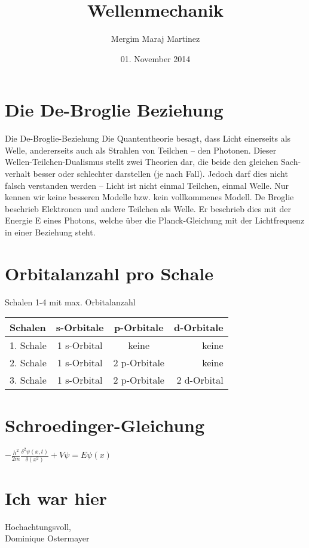 \documentclass{article}
\author{Mergim Maraj Martinez}
\title{Wellenmechanik}
\date{01. November 2014}
\begin{document}
\maketitle

\section{Die De-Broglie Beziehung}
Die De-Broglie-Beziehung
Die Quantentheorie besagt, dass Licht einerseits als Welle, andererseits auch als Strahlen von Teilchen – den Photonen. Dieser Wellen-Teilchen-Dualismus stellt zwei Theorien dar, die beide den gleichen Sach-verhalt besser oder schlechter darstellen (je nach Fall). Jedoch darf dies nicht falsch verstanden werden – Licht ist nicht einmal Teilchen, einmal Welle. Nur kennen wir keine besseren Modelle bzw. kein vollkommenes Modell. De Broglie beschrieb Elektronen und andere Teilchen als Welle. Er beschrieb dies mit der Energie E eines Photons, welche über die Planck-Gleichung mit der Lichtfrequenz in einer Beziehung steht.

\section{Orbitalanzahl pro Schale}
Schalen 1-4 mit max. Orbitalanzahl
\begin{center}
\begin{tabular}{l|c|c|r}
Schalen & s-Orbitale & p-Orbitale & d-Orbitale\\
\hline
1. Schale & 1 s-Orbital & keine & keine \\
2. Schale & 1 s-Orbital & 2 p-Orbitale & keine\\
3. Schale & 1 s-Orbital & 2 p-Orbitale & 2 d-Orbital\\
\end{tabular}
\end{center}
\section{Schroedinger-Gleichung}
\begin{center}
$-\frac{h^{2}}{2m}\frac{\delta^{2}\psi(x,t)}{\delta(x^{2})}+V\psi=E\psi(x)$
\end{center}

\section{Ich war hier}
Hochachtungsvoll, \\
Dominique Ostermayer 
\end{document}

